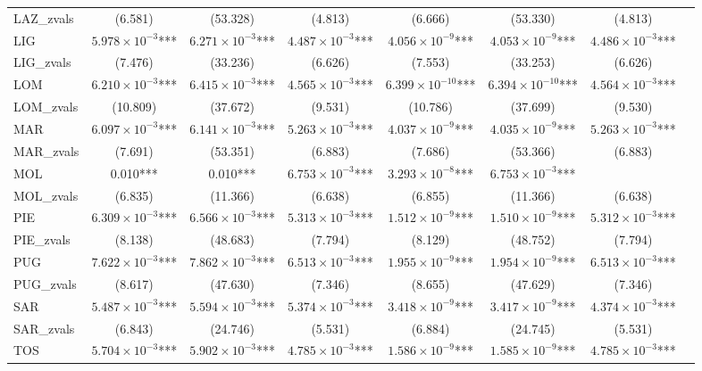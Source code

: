 \documentclass[12pt]{article}
\begin{document}
\begin{landscape}
\begin{longtable}{@{}lccccccc@{}}
        LAZ\_zvals & (6.581) & (53.328) & (4.813) & (6.666) & (53.330) & (4.813) \\ 
        LIG & $5.978 \times 10^{-3}$*** & $6.271 \times 10^{-3}$*** & $4.487 \times 10^{-3}$*** & $4.056 \times 10^{-9}$*** & $4.053 \times 10^{-9}$*** & $4.486 \times 10^{-3}$*** \\ 
        LIG\_zvals & (7.476) & (33.236) & (6.626) & (7.553) & (33.253) & (6.626) \\ 
        LOM & $6.210 \times 10^{-3}$*** & $6.415 \times 10^{-3}$*** & $4.565 \times 10^{-3}$*** & $6.399 \times 10^{-10}$*** & $6.394 \times 10^{-10}$*** & $4.564 \times 10^{-3}$*** \\ 
        LOM\_zvals & (10.809) & (37.672) & (9.531) & (10.786) & (37.699) & (9.530) \\ 
        MAR & $6.097 \times 10^{-3}$*** & $6.141 \times 10^{-3}$*** & $5.263 \times 10^{-3}$*** & $4.037 \times 10^{-9}$*** & $4.035 \times 10^{-9}$*** & $5.263 \times 10^{-3}$*** \\ 
        MAR\_zvals & (7.691) & (53.351) & (6.883) & (7.686) & (53.366) & (6.883) \\ 
        MOL & 0.010*** & 0.010*** & $6.753 \times 10^{-3}$*** & $3.293 \times 10^{-8}$*** & $6.753 \times 10^{-3}$*** \\ 
        MOL\_zvals & (6.835) & (11.366) & (6.638) & (6.855) & (11.366) & (6.638) \\ 
        PIE & $6.309 \times 10^{-3}$*** & $6.566 \times 10^{-3}$*** & $5.313 \times 10^{-3}$*** & $1.512 \times 10^{-9}$*** & $1.510 \times 10^{-9}$*** & $5.312 \times 10^{-3}$*** \\ 
        PIE\_zvals & (8.138) & (48.683) & (7.794) & (8.129) & (48.752) & (7.794) \\ 
        PUG & $7.622 \times 10^{-3}$*** & $7.862 \times 10^{-3}$*** & $6.513 \times 10^{-3}$*** & $1.955 \times 10^{-9}$*** & $1.954 \times 10^{-9}$*** & $6.513 \times 10^{-3}$*** \\ 
        PUG\_zvals & (8.617) & (47.630) & (7.346) & (8.655) & (47.629) & (7.346) \\ 
        SAR & $5.487 \times 10^{-3}$*** & $5.594 \times 10^{-3}$*** & $5.374 \times 10^{-3}$*** & $3.418 \times 10^{-9}$*** & $3.417 \times 10^{-9}$*** & $4.374 \times 10^{-3}$*** \\ 
        SAR\_zvals & (6.843) & (24.746) & (5.531) & (6.884) & (24.745) & (5.531) \\ 
        TOS & $5.704 \times 10^{-3}$*** & $5.902 \times 10^{-3}$*** & $4.785 \times 10^{-3}$*** & $1.586 \times 10^{-9}$*** & $1.585 \times 10^{-9}$*** & $4.785 \times 10^{-3}$*** \\ 

\end{longtable}
\end{landscape}
\end{document}
